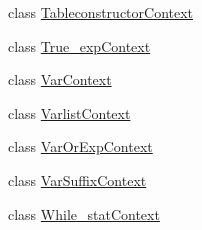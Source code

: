 \begin{DoxyCompactItemize}
\item 
class \mbox{\hyperlink{classzlua_1_1_lua_parser_1_1_tableconstructor_context}{Tableconstructor\+Context}}
\item 
class \mbox{\hyperlink{classzlua_1_1_lua_parser_1_1_true__exp_context}{True\+\_\+exp\+Context}}
\item 
class \mbox{\hyperlink{classzlua_1_1_lua_parser_1_1_var_context}{Var\+Context}}
\item 
class \mbox{\hyperlink{classzlua_1_1_lua_parser_1_1_varlist_context}{Varlist\+Context}}
\item 
class \mbox{\hyperlink{classzlua_1_1_lua_parser_1_1_var_or_exp_context}{Var\+Or\+Exp\+Context}}
\item 
class \mbox{\hyperlink{classzlua_1_1_lua_parser_1_1_var_suffix_context}{Var\+Suffix\+Context}}
\item 
class \mbox{\hyperlink{classzlua_1_1_lua_parser_1_1_while__stat_context}{While\+\_\+stat\+Context}}
\end{DoxyCompactItemize}
